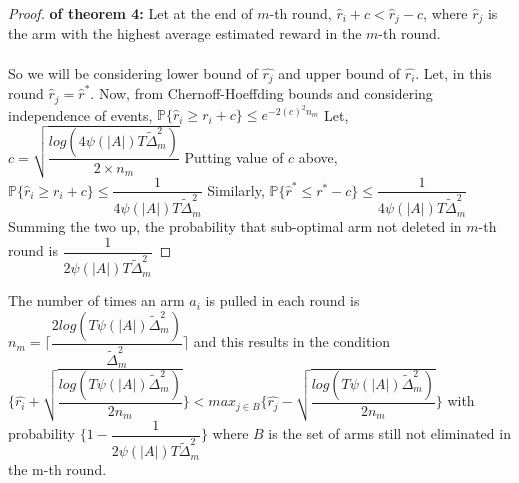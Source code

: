 \begin{proof}\textbf{ of theorem 4:} Let at the end of $m$-th round, 
\newline
\hspace*{8em}$\hat{r}_{i}+c<\hat{r}_{j}-c$, where $\hat{r}_{j}$ is the arm with the highest average estimated reward in the $m$-th round.
\paragraph*{}So we will be considering lower bound of $\hat{r_{j}}$ and upper bound of $\hat{r_{i}}$. 
Let, in this round $\hat{r}_{j}=\hat{r}^{*}$.
Now, from Chernoff-Hoeffding bounds and considering independence of events,
\newline
\newline
\hspace*{8em}$\mathbb{P}\lbrace\hat{r}_{i} \geq r_{i} + c\rbrace \leq e^{-2(c)^{2}n_{m}}$
\newline 
\newline
Let, $c= \sqrt{\dfrac{log({4\psi(|A|)T\tilde{\Delta}_{m}^{2}})}{2\times n_{m}}}$
\newline Putting value of $c$ above,
\newline \hspace*{8em}$\mathbb{P} \lbrace  \hat{r}_{i} \geq r_{i} + c \rbrace \leq \dfrac{1}{4\psi(|A|)T\tilde{\Delta}_{m}^{2}}$
\newline Similarly, $\mathbb{P} \lbrace \hat{r}^{*} \leq r^{*} - c \rbrace\leq \dfrac{1}{4\psi(|A|)T\tilde{\Delta}_{m}^{2}}$
\newline
Summing the two up, the probability that sub-optimal arm not deleted in $m$-th round is $\dfrac{1}{2\psi(|A|)T\tilde{\Delta}_{m}^{2}}$
\end{proof}

\begin{corollary}
The number of times an arm $a_{i}$ is pulled in each round is $n_{m} = \bigg\lceil \dfrac{2log({T\psi(|A|)\tilde{\Delta}_{m}^{2}})}{\tilde{\Delta}_{m}^{2}} \bigg\rceil$ and this results in the condition $ \bigg\lbrace\hat{r_{i}}+\sqrt{\dfrac{log({T\psi(|A|)\tilde{\Delta}_{m}^{2}})}{2n_{m}}}\bigg\rbrace < max_{j\in B}\bigg\lbrace\hat{r_{j}}-\sqrt{\dfrac{log({T\psi(|A|)\tilde{\Delta}_{m}^{2}})}{2n_{m}}}\bigg\rbrace$ with probability $\bigg\lbrace 1-\dfrac{1}{2\psi(|A|)T\tilde{\Delta}_{m}^{2}}\bigg\rbrace$ where $B$ is the set of arms still not eliminated in the m-th round.
\end{corollary}

